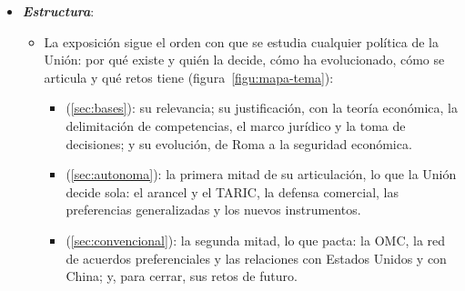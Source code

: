 \documentclass[11pt]{article}
\begin{document}
\begin{itemize}
\item \textbf{\emph{Estructura}}:
  \begin{itemize}
  \item La exposición sigue el orden con que se estudia cualquier política de la Unión: por qué existe y quién la decide, cómo ha evolucionado, cómo se articula y qué retos tiene (figura~\ref{figu:mapa-tema}):
    \begin{itemize}
    \item {} (\ref{sec:bases}): su relevancia; su justificación, con la teoría económica, la delimitación de competencias, el marco jurídico y la toma de decisiones; y su evolución, de Roma a la seguridad económica.
    \item {} (\ref{sec:autonoma}): la primera mitad de su articulación, lo que la Unión decide sola: el arancel y el TARIC, la defensa comercial, las preferencias generalizadas y los nuevos instrumentos.
    \item {} (\ref{sec:convencional}): la segunda mitad, lo que pacta: la OMC, la red de acuerdos preferenciales y las relaciones con Estados Unidos y con China; y, para cerrar, sus retos de futuro.
    \end{itemize}
  \end{itemize}
\end{itemize}
\end{document}
